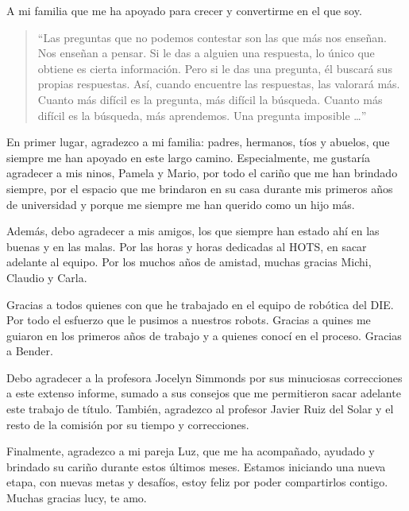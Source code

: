 \begin{dedicatoria}
A mi familia que me ha apoyado para crecer y convertirme en el que soy.
\vspace{50pt}
\begin{quote}
	``Las preguntas que no podemos contestar son las que más nos enseñan. Nos enseñan a pensar. Si le das a alguien una respuesta, lo único que obtiene es cierta información. Pero si le das una pregunta, él buscará sus propias respuestas. Así, cuando encuentre las respuestas, las valorará más. Cuanto más difícil es la pregunta, más difícil la búsqueda. Cuanto más difícil es la búsqueda, más aprendemos. Una pregunta imposible \ldots''
\end{quote}

\end{dedicatoria}

\begin{thanks}

En primer lugar, agradezco a mi familia: padres, hermanos, tíos y abuelos, que siempre me han apoyado en este largo camino. Especialmente, me gustaría agradecer a mis ninos, Pamela y Mario, por todo el cariño que me han brindado siempre, por el espacio que me brindaron en su casa durante mis primeros años de universidad y porque me siempre me han querido como un hijo más.

Además, debo agradecer a mis amigos, los que siempre han estado ahí en las buenas y en las malas. Por las horas y horas dedicadas al HOTS, en sacar adelante al equipo. Por los muchos años de amistad, muchas gracias Michi, Claudio y Carla.

Gracias a todos quienes con que he trabajado en el equipo de robótica del DIE. Por todo el esfuerzo que le pusimos a nuestros robots. Gracias a quines me guiaron en los primeros años de trabajo y a quienes conocí en el proceso. Gracias a Bender.

Debo agradecer a la profesora Jocelyn Simmonds por sus minuciosas correcciones a este extenso informe, sumado a sus consejos que me permitieron sacar adelante este trabajo de título. También, agradezco al profesor Javier Ruiz del Solar y el resto de la comisión por su tiempo y correcciones.

Finalmente, agradezco a mi pareja Luz, que me ha acompañado, ayudado y brindado su cariño durante estos últimos meses. Estamos iniciando una nueva etapa, con nuevas metas y desafíos, estoy feliz por poder compartirlos contigo. Muchas gracias lucy, te amo.

\end{thanks}
